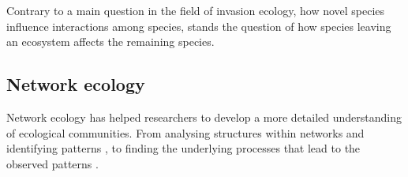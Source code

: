 \documentclass[12pt,a4paper]{article}
\begin{document}
Contrary to a main question in the field of invasion ecology, how novel species influence interactions among species, stands the question of how species leaving an ecosystem affects the remaining species. 


%
\subsection{Network ecology}
Network ecology has helped researchers to develop a more detailed understanding of ecological communities. From analysing structures within networks and identifying patterns \parencite{Jordano1987, Dunne2002}, %
to finding the underlying processes that lead to the observed patterns \parencite{Rezende2007, Vazquez2009, Thebault2010}.

\end{document}
